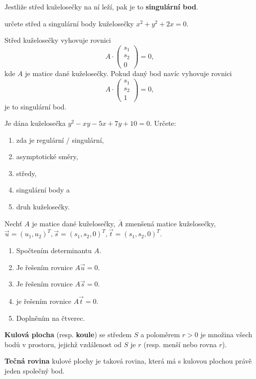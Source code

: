 \begin{definition}
    Jestliže střed kuželosečky na ní leží, pak je to \textbf{singulární bod}.
\end{definition}

\begin{priklad}
určete střed a singulární body kuželosečky $x^2+y^2+2x=0.$
\end{priklad}

\begin{reseni}
Střed kuželosečky vyhovuje rovnici
$$A\cdot \begin{pmatrix}
    s_1 \\
    s_2\\
    0
\end{pmatrix}=0,
$$
kde $A$ je matice dané kuželosečky. Pokud daný bod navíc vyhovuje rovnici
$$A\cdot \begin{pmatrix}
    s_1 \\
    s_2\\
    1
\end{pmatrix}=0,
$$
je to singulární bod.
\end{reseni}

\begin{priklad}
Je dána kuželosečka $y^2-xy-5x+7y+10=0.$ Určete:
\begin{enumerate}[$a.$]
\item zda je regulární / singulární,
\item asymptotické směry,
\item středy,
\item singulární body a
\item druh kuželosečky.
\end{enumerate}
\end{priklad}

\begin{reseni}
Nechť $A$ je matice dané kuželosečky, $\bar{A}$ zmenšená matice kuželosečky, $\vec u=(u_1,u_2)^T, \vec s=(s_1,s_2,0)^T,\vec t=(s_1,s_2,0)^T$.
\begin{enumerate}[$a.$]
\item Spočtením determinantu $A$.
\item Je řešením rovnice $A\vec u=0.$
\item Je řešením rovnice $A\vec s=0.$
\item je řešením rovnice $A\vec t = 0.$
\item Doplněním na čtverec.
\end{enumerate}
\end{reseni}

\begin{definition}
\textbf{Kulová plocha} (resp. \textbf{koule}) se středem $S$ a poloměrem $r>0$ je množina všech bodů v prostoru,
jejichž vzdálenost od $S$ je $r$ (resp. menší nebo rovna $r$).
\end{definition}

\begin{definition}
\textbf{Tečná rovina} kulové plochy je taková rovina, která má s kulovou plochou právě
jeden společný bod.
\end{definition}
